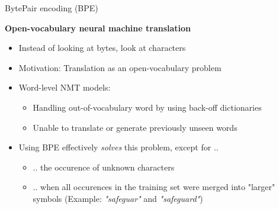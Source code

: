 \documentclass[11pt,compress,t,notes=noshow, xcolor=table]{beamer}
\begin{document}

\begin{vbframe}{BytePair encoding (BPE)}

\vfill

\textbf{Open-vocabulary neural machine translation \href{https://www.aclweb.org/anthology/P16-1162.pdf}{}}
	
	\begin{itemize}
		\item Instead of looking at bytes, look at characters
		\item Motivation: Translation as an open-vocabulary problem
		\item Word-level NMT models:
			\begin{itemize}
				\item Handling out-of-vocabulary word by using back-off dictionaries
				\item Unable to translate or generate previously unseen words
			\end{itemize}
		\item Using BPE effectively \textit{solves} this problem, except for ..
			\begin{itemize}
				\item .. the occurence of unknown characters
				\item .. when all occurences in the training set were merged into "larger" symbols
							(Example: \textit{"safeguar"} and \textit{"safeguard"})
			\end{itemize}
	\end{itemize}

\vfill

\end{vbframe}

\end{document}
